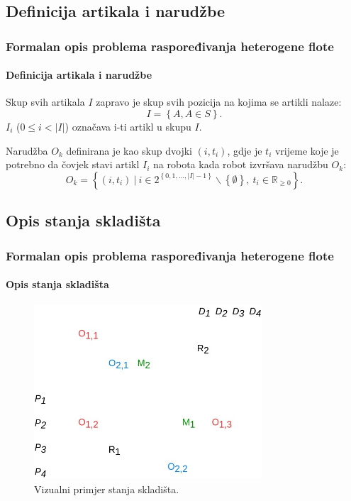 \documentclass{beamer}
\begin{document}
\subsection{Definicija artikala i narudžbe}
\begin{frame}
\frametitle{Formalan opis problema raspoređivanja heterogene flote}
\framesubtitle{Definicija artikala i narudžbe}
Skup svih artikala $I$ zapravo je skup svih pozicija na kojima se artikli nalaze:
\begin{equation}
I = \left\{A, A \in S\right\}.
\end{equation}
$I_i$ ($0 \le i < |I|$) označava i-ti artikl u skupu $I$.

Narudžba $O_k$ definirana
je kao skup dvojki $(i, t_{i})$, gdje je $t_{i}$ vrijeme koje je potrebno
da čovjek stavi artikl $I_i$ na robota kada robot izvršava narudžbu $O_k$:
\begin{equation}
O_k = \left\{ (i, t_{i})\ |\ i \in 2^{\left\{0, 1, ..., |I|-1\right\}}\backslash\left\{\emptyset\right\},\ t_{i} \in \mathbb{R}_{\ge0}\right\}.
\end{equation}
\end{frame}

\subsection{Opis stanja skladišta}
\begin{frame}
\frametitle{Formalan opis problema raspoređivanja heterogene flote}
\framesubtitle{Opis stanja skladišta}
\begin{figure}[htb]
    \centering
    \includegraphics[width=8.5cm]{images/state.jpg}
    \caption{Vizualni primjer stanja skladišta.}
\end{figure}
\end{frame}
\end{document}
